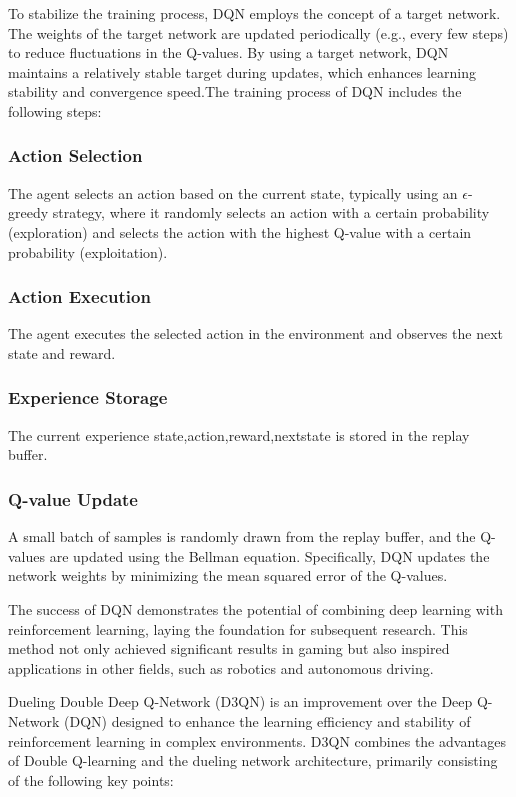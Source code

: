 \documentclass[journal]{IEEEtran}
\begin{document}
To stabilize the training process, DQN employs the concept of a target network. The weights of the target network are updated periodically (e.g., every few steps) to reduce fluctuations in the Q-values. By using a target network, DQN maintains a relatively stable target during updates, which enhances learning stability and convergence speed.The training process of DQN includes the following steps:

\subsubsection{Action Selection}The agent selects an action based on the current state, typically using an $\epsilon$-greedy strategy, where it randomly selects an action with a certain probability (exploration) and selects the action with the highest Q-value with a certain probability (exploitation).

\subsubsection{Action Execution}The agent executes the selected action in the environment and observes the next state and reward.

\subsubsection{Experience Storage}The current experience state,action,reward,nextstate is stored in the replay buffer.

\subsubsection{Q-value Update}A small batch of samples is randomly drawn from the replay buffer, and the Q-values are updated using the Bellman equation. Specifically, DQN updates the network weights by minimizing the mean squared error of the Q-values.

The success of DQN demonstrates the potential of combining deep learning with reinforcement learning, laying the foundation for subsequent research. This method not only achieved significant results in gaming but also inspired applications in other fields, such as robotics and autonomous driving.

Dueling Double Deep Q-Network (D3QN) is an improvement over the Deep Q-Network (DQN) designed to enhance the learning efficiency and stability of reinforcement learning in complex environments. D3QN combines the advantages of Double Q-learning and the dueling network architecture, primarily consisting of the following key points:
\end{document}
